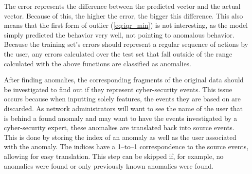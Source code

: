 The error represents the difference between the predicted vector and the actual vector. Because of this, the higher the error, the bigger this difference. This also means that the first form of outlier (\ref{eq:iqr_min}) is not interesting, as the model simply predicted the behavior very well, not pointing to anomalous behavior. Because the training set's errors should represent a regular sequence of actions by the user, any errors calculated over the test set that fall outside of the range calculated with the above functions are classified as anomalies.

After finding anomalies, the corresponding fragments of the original data should be investigated to find out if they represent cyber-security events. This issue occurs because when inputting solely features, the events they are based on are discarded. As network administrators will want to see the name of the user that is behind a found anomaly and may want to have the events investigated by a cyber-security expert, these anomalies are translated back into source events. This is done by storing the index of an anomaly as well as the user associated with the anomaly. The indices have a 1--to--1 correspondence to the source events, allowing for easy translation. This step can be skipped if, for example, no anomalies were found or only previously known anomalies were found.


